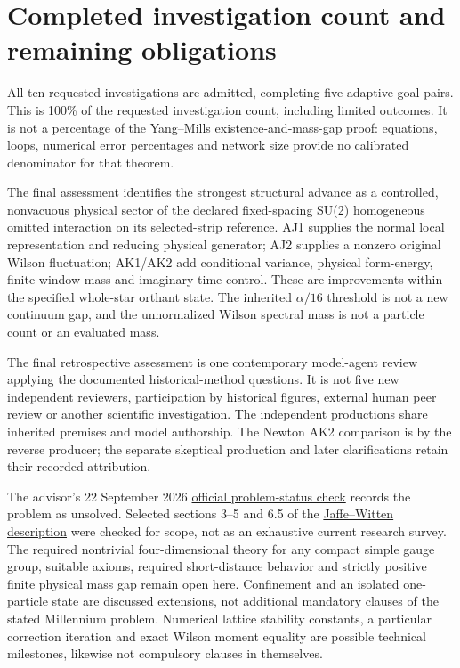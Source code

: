 \section{Completed investigation count and remaining obligations}
\label{sec:closeout}
All ten requested investigations are admitted, completing five adaptive goal pairs. This is 100\% of the requested investigation count, including limited outcomes. It is not a percentage of the Yang--Mills existence-and-mass-gap proof: equations, loops, numerical error percentages and network size provide no calibrated denominator for that theorem.

The final assessment identifies the strongest structural advance as a controlled, nonvacuous physical sector of the declared fixed-spacing SU(2) homogeneous omitted interaction on its selected-strip reference. AJ1 supplies the normal local representation and reducing physical generator; AJ2 supplies a nonzero original Wilson fluctuation; AK1/AK2 add conditional variance, physical form-energy, finite-window mass and imaginary-time control. These are improvements within the specified whole-star orthant state. The inherited $\alpha/16$ threshold is not a new continuum gap, and the unnormalized Wilson spectral mass is not a particle count or an evaluated mass.

The final retrospective assessment is one contemporary model-agent review applying the documented historical-method questions. It is not five new independent reviewers, participation by historical figures, external human peer review or another scientific investigation. The independent productions share inherited premises and model authorship. The Newton AK2 comparison is by the reverse producer; the separate skeptical production and later clarifications retain their recorded attribution.

The advisor's 22 September 2026 \href{https://www.claymath.org/millennium/yang-mills-the-maths-gap/}{official problem-status check} records the problem as unsolved. Selected sections 3--5 and 6.5 of the \href{https://www.claymath.org/wp-content/uploads/2022/06/yangmills.pdf}{Jaffe--Witten description} were checked for scope, not as an exhaustive current research survey. The required nontrivial four-dimensional theory for any compact simple gauge group, suitable axioms, required short-distance behavior and strictly positive finite physical mass gap remain open here. Confinement and an isolated one-particle state are discussed extensions, not additional mandatory clauses of the stated Millennium problem. Numerical lattice stability constants, a particular correction iteration and exact Wilson moment equality are possible technical milestones, likewise not compulsory clauses in themselves.

